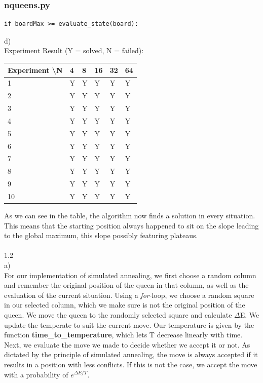 \documentclass{article}
\begin{document}
\subsubsection*{nqueens.py}
\begin{lstlisting}
if boardMax >= evaluate_state(board):
\end{lstlisting}
d)
\\
Experiment Result (Y = solved, N = failed): \\
\begin{center}
\begin{tabular}{|l|l|l|l|l|l|}
\hline
Experiment \textbackslash N & 4 & 8 & 16 & 32 & 64 \\ \hline
1                           & Y & Y & Y  & Y  & Y  \\ \hline
2                           & Y & Y & Y  & Y  & Y  \\ \hline
3                           & Y & Y & Y  & Y  & Y  \\ \hline
4                           & Y & Y & Y  & Y  & Y  \\ \hline
5                           & Y & Y & Y  & Y  & Y  \\ \hline
6                           & Y & Y & Y  & Y  & Y  \\ \hline
7                           & Y & Y & Y  & Y  & Y  \\ \hline
8                           & Y & Y & Y  & Y  & Y  \\ \hline
9                           & Y & Y & Y  & Y  & Y  \\ \hline
10                          & Y & Y & Y  & Y  & Y  \\ \hline
\end{tabular}
\end{center}
As we can see in the table, the algorithm now finds a solution in every situation. This means that the starting position always happened to sit on the slope leading to the global maximum, this slope possibly featuring plateaus. 
\\
\\
1.2
\\
a) 
\\
For our implementation of simulated annealing, we first choose a random column and remember the original position of the queen in that column, as well as the evaluation of the current situation. Using a \emph{for}-loop, we choose a random square in our selected column, which we make sure is not the original position of the queen. We move the queen to the randomly selected square and calculate $\Delta$E. We update the temperate to suit the current move. Our temperature is given by the function \textbf{time\_to\_temperature}, which lets T decrease linearly with time. Next, we evaluate the move we made to decide whether we accept it or not. As dictated by the principle of simulated annealing, the move is always accepted if it results in a position with less conflicts. If this is not the case, we accept the move with a probability of $ e^{\Delta E / T} $. 
\end{document}
